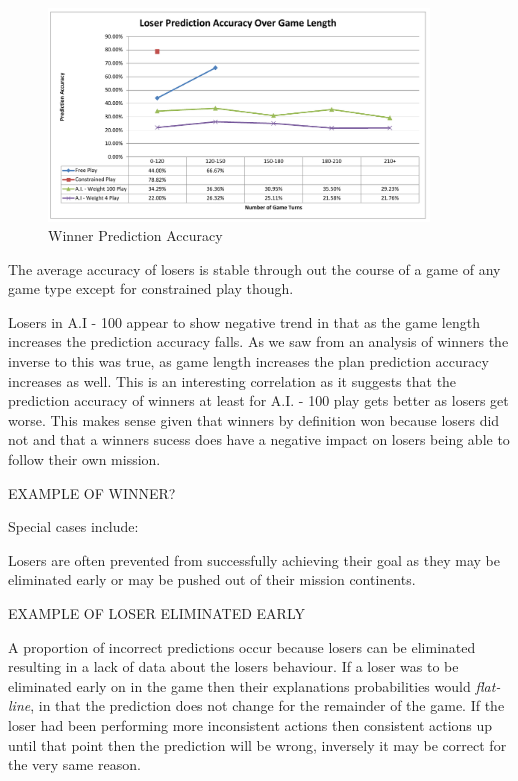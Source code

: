 \documentclass[parskip]{cs4rep}
\begin{document}
\begin{figure}[h]
\centerline{
\includegraphics[width=0.9\textwidth]{images/loser-game-length.pdf}
}
\caption{Winner Prediction Accuracy}
\label{fig:dom-debug-gui}
\end{figure}

The average accuracy of losers is stable through out the course of a game of any game type except for constrained play though.

Losers in A.I - 100 appear to show negative trend in that as the game length increases the prediction accuracy falls. As we saw from an analysis of winners the inverse to this was true, as game length increases the plan prediction accuracy increases as well. This is an interesting correlation as it suggests that the prediction accuracy of winners at least for A.I. - 100 play gets better as losers get worse. This makes sense given that winners by definition won because losers did not and that a winners sucess does have a negative impact on losers being able to follow their own mission.

EXAMPLE OF WINNER?

Special cases include:

Losers are often prevented from successfully achieving their goal as they may be eliminated early or may be pushed out of their mission continents.

EXAMPLE OF LOSER ELIMINATED EARLY

A proportion of incorrect predictions occur because losers can be eliminated resulting in a lack of data about the losers behaviour. If a loser was to be eliminated early on in the game then their explanations probabilities would \textit{flat-line}, in that the prediction does not change for the remainder of the game. If the loser had been performing more inconsistent actions then consistent actions up until that point then the prediction will be wrong, inversely it may be correct for the very same reason.
\end{document}
